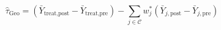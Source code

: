 \begin{theorem}
\begin{equation}
  \hat{\tau}_{\text{Geo}} = (\bar{Y}_{\text{treat,post}} - \bar{Y}_{\text{treat,pre}}) - \sum_{j \in \mathcal{C}} w_j^{\ast} (\bar{Y}_{j,\text{post}} - \bar{Y}_{j,\text{pre}})
\end{equation}
\end{theorem}
